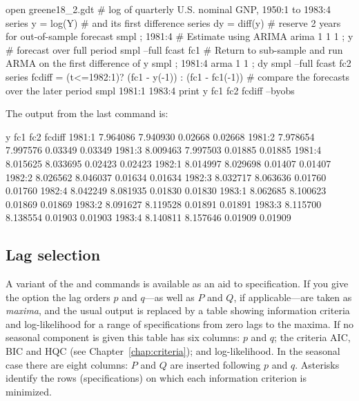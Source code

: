 \begin{script}[htbp]
\begin{scode}
open greene18_2.gdt
# log of quarterly U.S. nominal GNP, 1950:1 to 1983:4
series y = log(Y)
# and its first difference
series dy = diff(y)
# reserve 2 years for out-of-sample forecast
smpl ; 1981:4
# Estimate using ARIMA
arima 1 1 1 ; y 
# forecast over full period
smpl --full
fcast fc1
# Return to sub-sample and run ARMA on the first difference of y
smpl ; 1981:4
arma 1 1 ; dy
smpl --full
fcast fc2
series fcdiff = (t<=1982:1)? (fc1 - y(-1)) : (fc1 - fc1(-1))
# compare the forecasts over the later period
smpl 1981:1 1983:4
print y fc1 fc2 fcdiff --byobs
\end{scode}
The output from the last command is:
%
\begin{scodebot}
                  y          fc1          fc2       fcdiff
1981:1      7.964086     7.940930      0.02668      0.02668
1981:2      7.978654     7.997576      0.03349      0.03349
1981:3      8.009463     7.997503      0.01885      0.01885
1981:4      8.015625     8.033695      0.02423      0.02423
1982:1      8.014997     8.029698      0.01407      0.01407
1982:2      8.026562     8.046037      0.01634      0.01634
1982:3      8.032717     8.063636      0.01760      0.01760
1982:4      8.042249     8.081935      0.01830      0.01830
1983:1      8.062685     8.100623      0.01869      0.01869
1983:2      8.091627     8.119528      0.01891      0.01891
1983:3      8.115700     8.138554      0.01903      0.01903
1983:4      8.140811     8.157646      0.01909      0.01909
\end{scodebot}
\end{script}

\subsection{Lag selection}
\label{arma-lagsel}

A variant of the  and  commands is available as
an aid to specification. If you give the  option the
lag orders $p$ and $q$---as well as $P$ and $Q$, if applicable---are
taken as \textit{maxima}, and the usual output is replaced by a table
showing information criteria and log-likelihood for a range of
specifications from zero lags to the maxima. If no seasonal component
is given this table has six columns: $p$ and $q$; the criteria AIC,
BIC and HQC (see Chapter~\ref{chap:criteria}); and log-likelihood. In
the seasonal case there are eight columns: $P$ and $Q$ are inserted
following $p$ and $q$. Asterisks identify the rows (specifications) on
which each information criterion is minimized.

